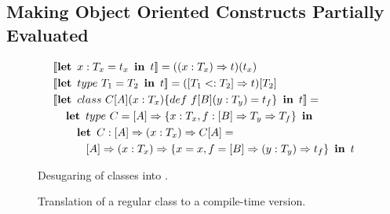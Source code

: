 \subsection{Making Object Oriented Constructs Partially Evaluated}
\label{sct:promotion}



\begin{figure}
\begin{alignat*}{2}
   & [\![ \klet\ x: T_x = t_x\ \kin \ t ]\!] = ((x: T_x) \ra t)(t_x)\\
   & [\![ \klet\ type\ T_1 = T_2\ \kin\ t ]\!] =  ([T_1 <: T_2] \ra t)[T_2] \\
   & [\![ \klet\ class\ C[A](x: T_x) \{ def\ f[B](y: T_y) = t_f \}\ \kin\ t ]\!]  =  \\
   & \quad   \klet\ type\  C = [A] \ra \{ x: T_x, f: [B] \ra T_y \ra T_f \}\ \kin  \\
   & \quad \quad \klet\ C: [A] \ra (x: T_x) \ra C[A]  =  \\
   & \quad \quad \quad [A] \ra (x: T_x) \ra \{ x = x, f = [B] \ra (y: T_y) \ra t_f \}\ \kin\ t
\end{alignat*}
\caption{Desugaring of classes into \calculus.}
\end{figure}

\begin{figure}
\begin{multicols}{2}[]

    {\Pi \ts {}}

    {\Pi \ts {}}

\end{multicols}
\vspace{4pt}

    {\Pi \ts {}}

    {\Pi \ts {}}

    {\Pi \ts {}}

    {\Pi \ts {}}

    {\Pi \ts {}}

    {\Pi \ts {}}

    {\Pi \ts {}}

\caption{Translation of a regular class to a compile-time version.}
\label{fig:partial-evaluation}
\end{figure}
